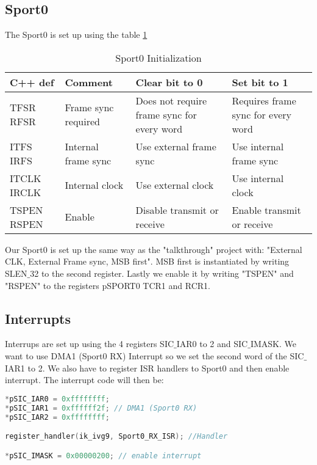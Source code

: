 \subsection{Sport0}
The Sport0 is set up using the table \ref{table:Sport0}
\begin{table}[htbp]
    \begin{tabular}{| p{1.5cm} | l | p{4.5cm} | p{4.5cm} |}
    \hline
    C++ def      & Comment                   & Clear bit to 0                                   & Set bit to 1                             \\ \hline
    TFSR RFSR   & Frame sync required 		 & Does not require frame sync for every word & Requires frame  					sync for every word \\ \hline
    ITFS IRFS   & Internal frame  					sync & Use external  					frame sync                    & Use internal  					frame sync            \\ \hline
    ITCLK IRCLK & Internal clock            & Use external  					clock                         & Use internal  					clock                 \\ \hline
    TSPEN RSPEN & Enable                    & Disable transmit  					or receive                & Enable transmit  					or receive         \\ \hline
    \end{tabular}
    \caption{Sport0 Initialization}
    \label{table:Sport0}
\end{table}
Our Sport0 is set up the same way as the "talkthrough" project with: "External CLK, External Frame sync, MSB first". MSB first is instantiated by writing SLEN$\_$32 to the second register. Lastly we enable it by writing "TSPEN" and "RSPEN" to the registers pSPORT0 TCR1 and RCR1.
\subsection{Interrupts}
Interrups are set up using the 4 registers SIC$\_$IAR0 to 2 and SIC$\_$IMASK. We want to use DMA1 (Sport0 RX) Interrupt so we set the second word of the SIC$\_$IAR1 to 2. We also have to register ISR handlers to Sport0 and then enable interrupt. The interrupt code will then be:
\begin{lstlisting}[language=C]
*pSIC_IAR0 = 0xffffffff;
*pSIC_IAR1 = 0xffffff2f; // DMA1 (Sport0 RX)
*pSIC_IAR2 = 0xffffffff;

register_handler(ik_ivg9, Sport0_RX_ISR); //Handler

*pSIC_IMASK = 0x00000200; // enable interrupt
\end{lstlisting}
